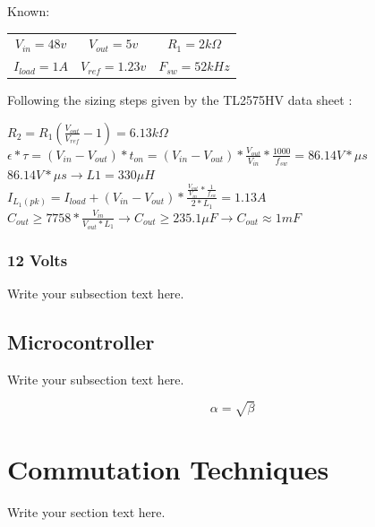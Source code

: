 \documentclass{article}
\begin{document}
		\vspace{3mm}
		\noindent Known:
		\begin{center}
			\begin{tabular}{ c c c }
			$V_{in} = 48v$ & $V_{out} = 5v$ & $R_{1} = 2k\Omega$ \\
			$I_{load} = 1A$ & $V_{ref} = 1.23v$ & $F_{sw} = 52kHz$
			\end{tabular}
		\end{center}
	
		\noindent Following the sizing steps given by the TL2575HV data sheet \cite{buck converter}:
		\begin{center}
			$R_{2} = R_{1}(\frac{V_{out}}{V_{ref}} - 1) = 6.13k\Omega$ \\
			\vspace{2mm}
			$\epsilon * \tau = (V_{in} - V_{out})*t_{on} = (V_{in} - V_{out}) * \frac{V_{out}}{V_{in}} * \frac{1000}{f_{sw}} = 86.14 V*\mu s$ \\
			\vspace{4mm}
			$86.14 V*\mu s \rightarrow L1 = 330\mu H$ \\
			\vspace{3mm}
			$I_{L_{1}(pk)} = I_{load} + (V_{in} - V_{out}) * \frac{\frac{V_{out}}{V_{in}} * \frac{1}{f_{sw}}}{2*L_{1}} = 1.13 A$ \\
			\vspace{4mm}
			$C_{out} \ge 7758 * \frac{V_{in}}{V_{out} * L_{1}} \rightarrow C_{out} \ge 235.1\mu F \rightarrow C_{out} \approx 1mF$
		\end{center}
		
		
		\subsubsection{12 Volts}
		Write your subsection text here.
	
		\subsection{Microcontroller}
		Write your subsection text here.
	
		\begin{equation}
		\label{simple_equation}
		\alpha = \sqrt{ \beta }
		\end{equation}
	
	\section{Commutation Techniques}
	Write your section text here.
	
\end{document}
